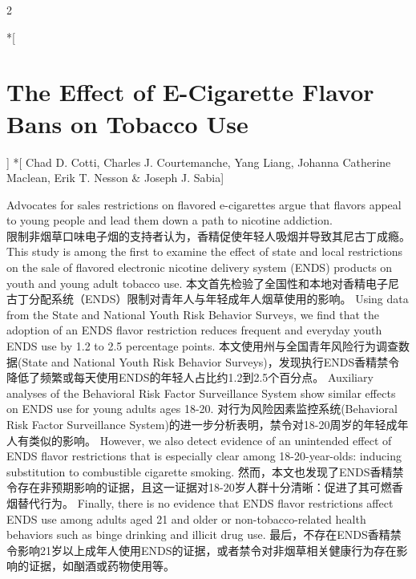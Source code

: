 \documentclass[cn,hazy,blue,14pt,screen]{elegantnote}
\begin{document}
\begin{paracol}{2}

	\switchcolumn[0]*[\section{The Effect of E-Cigarette Flavor Bans on Tobacco Use}]
	\switchcolumn[0]*[	Chad D. Cotti, Charles J. Courtemanche, Yang Liang, Johanna Catherine Maclean, Erik T. Nesson \& Joseph J. Sabia]
	\switchcolumn
	
	\switchcolumn
	Advocates for sales restrictions on flavored e-cigarettes argue that flavors appeal to young people and lead them down a path to nicotine addiction. \\
	\switchcolumn
	限制非烟草口味电子烟的支持者认为，香精促使年轻人吸烟并导致其尼古丁成瘾。
	\switchcolumn*
	This study is among the first to examine the effect of state and local restrictions on the sale of flavored electronic nicotine delivery system (ENDS) products on youth and young adult tobacco use.
	\switchcolumn
	本文首先检验了全国性和本地对香精电子尼古丁分配系统（ENDS）限制对青年人与年轻成年人烟草使用的影响。
	\switchcolumn*
	Using data from the State and National Youth Risk Behavior Surveys, we find that the adoption of an ENDS flavor restriction reduces frequent and everyday youth ENDS use by 1.2 to 2.5 percentage points. 
	\switchcolumn
	本文使用州与全国青年风险行为调查数据(State and National Youth Risk Behavior Surveys)，发现执行ENDS香精禁令降低了频繁或每天使用ENDS的年轻人占比约1.2到2.5个百分点。
	\switchcolumn*
	Auxiliary analyses of the Behavioral Risk Factor Surveillance System show similar effects on ENDS use for young adults ages 18-20. 
	\switchcolumn
	对行为风险因素监控系统(Behavioral Risk Factor Surveillance System)的进一步分析表明，禁令对18-20周岁的年轻成年人有类似的影响。
	\switchcolumn*
	However, we also detect evidence of an unintended effect of ENDS flavor restrictions that is especially clear among 18-20-year-olds: inducing substitution to combustible cigarette smoking. 
	\switchcolumn
	然而，本文也发现了ENDS香精禁令存在非预期影响的证据，且这一证据对18-20岁人群十分清晰：促进了其可燃香烟替代行为。
	\switchcolumn*
	Finally, there is no evidence that ENDS flavor restrictions affect ENDS use among adults aged 21 and older or non-tobacco-related health behaviors such as binge drinking and illicit drug use.
	\switchcolumn
	最后，不存在ENDS香精禁令影响21岁以上成年人使用ENDS的证据，或者禁令对非烟草相关健康行为存在影响的证据，如酗酒或药物使用等。
	
\end{paracol}
\end{document}
